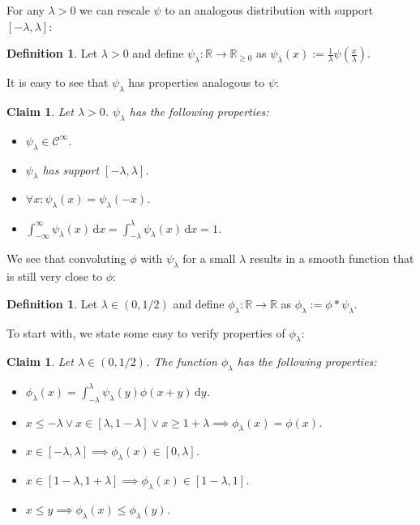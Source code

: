 \documentclass{daj}
\newcommand{\1}{\mathbbm{1}}
\theoremstyle{plain}
\newtheorem{claim}[theorem]{Claim}
\theoremstyle{definition}
\newtheorem{definition}[theorem]{Definition}
\begin{document}
For any $\lambda > 0$ we can rescale
$\psi$ to an analogous distribution with support $[-\lambda, \lambda]$:
\begin{definition}
Let $\lambda > 0$ and define $\psi_\lambda: \mathbb{R} \to \mathbb{R}_{\ge 0}$
as $\psi_\lambda(x) := \frac{1}{\lambda} \psi\left( \frac{x}{\lambda} \right)$.
\end{definition}

It is easy to see that $\psi_\lambda$ has properties analogous to $\psi$:
\begin{claim}
Let $\lambda > 0$. $\psi_\lambda$ has the following properties:
\begin{itemize}
\item $\psi_\lambda \in \mathcal{C}^{\infty}$.
\item $\psi_\lambda$ has support $[-\lambda, \lambda]$.
\item $\forall x: \psi_\lambda(x) = \psi_\lambda(-x)$.
\item $\int_{-\infty}^\infty \psi_\lambda(x) \, \mathrm{d}x = 
\int_{-\lambda}^{\lambda} \psi_\lambda(x) \, \mathrm{d}x = 1$.
\end{itemize}
\end{claim}

We see that convoluting $\phi$ with $\psi_\lambda$ for a small $\lambda$ 
results in a smooth function that is still very close to $\phi$:
\begin{definition}
Let $\lambda \in (0, 1/2)$ and define $\phi_\lambda: \mathbb{R} \to \mathbb{R}$ 
as $\phi_\lambda  := \phi \ast \psi_\lambda$.
\end{definition}

To start with, we state some easy to verify properties of $\phi_\lambda$:
\begin{claim}
\label{cl:phi-lambda}
Let $\lambda \in (0, 1/2)$. The function $\phi_\lambda$ has the following 
properties:
\begin{itemize}
  \item $\phi_\lambda(x) = 
    \int_{-\lambda}^{\lambda} \psi_\lambda(y) \phi(x+y) \, \mathrm{d}y$.
  \item $x \le -\lambda \lor x \in [\lambda, 1-\lambda] \lor x \ge 1+\lambda
    \implies \phi_\lambda(x) = \phi(x)$.
  \item $x \in [-\lambda, \lambda] \implies \phi_\lambda(x) \in [0, \lambda]$.
  \item $x \in [1-\lambda, 1+\lambda] \implies \phi_\lambda(x) 
    \in [1-\lambda, 1]$.
  \item $x \le y \implies \phi_\lambda(x) \le \phi_\lambda(y)$.
\end{itemize}
\end{claim}
\end{document}
